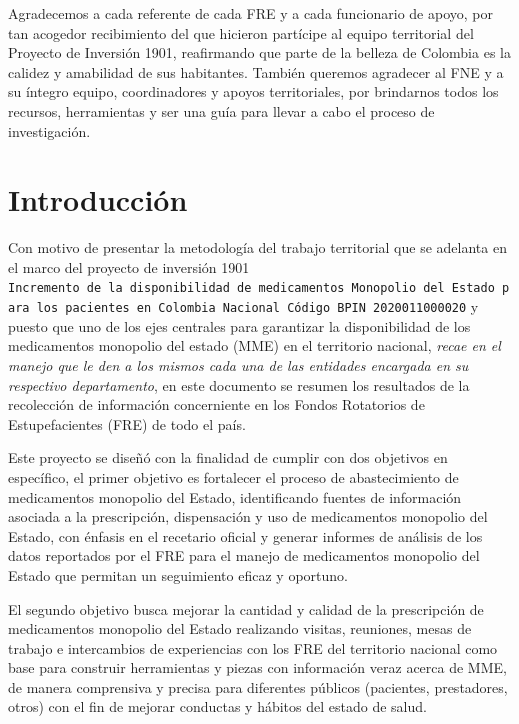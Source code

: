 \documentclass[
]{book}
\begin{document}
Agradecemos a cada referente de cada FRE y a cada funcionario de apoyo, por tan acogedor recibimiento del que hicieron partícipe al equipo territorial del Proyecto de Inversión 1901, reafirmando que parte de la belleza de Colombia es la calidez y amabilidad de sus habitantes. También queremos agradecer al FNE y a su íntegro equipo, coordinadores y apoyos territoriales, por brindarnos todos los recursos, herramientas y ser una guía para llevar a cabo el proceso de investigación.

\hypertarget{introducciuxf3n}{%
\chapter{Introducción}\label{introducciuxf3n}}

Con motivo de presentar la metodología del trabajo territorial que se adelanta en el marco del proyecto de inversión 1901 \texttt{Incremento\ de\ la\ disponibilidad\ de\ medicamentos\ Monopolio\ del\ Estado\ para\ los\ pacientes\ en\ Colombia\ Nacional\ Código\ BPIN\ 2020011000020} y puesto que uno de los ejes centrales para garantizar la disponibilidad de los medicamentos monopolio del estado (MME) en el territorio nacional, \emph{recae en el manejo que le den a los mismos cada una de las entidades encargada en su respectivo departamento}, en este documento se resumen los resultados de la recolección de información concerniente en los Fondos Rotatorios de Estupefacientes (FRE) de todo el país.

Este proyecto se diseñó con la finalidad de cumplir con dos objetivos en específico, el primer objetivo es fortalecer el proceso de abastecimiento de medicamentos monopolio del Estado, identificando fuentes de información asociada a la prescripción, dispensación y uso de medicamentos monopolio del Estado, con énfasis en el recetario oficial y generar informes de análisis de los datos reportados por el FRE para el manejo de medicamentos monopolio del Estado que permitan un seguimiento eficaz y oportuno.

El segundo objetivo busca mejorar la cantidad y calidad de la prescripción de medicamentos monopolio del Estado realizando visitas, reuniones, mesas de trabajo e intercambios de experiencias con los FRE del territorio nacional como base para construir herramientas y piezas con información veraz acerca de MME, de manera comprensiva y precisa para diferentes públicos (pacientes, prestadores, otros) con el fin de mejorar conductas y hábitos del estado de salud.
\end{document}
